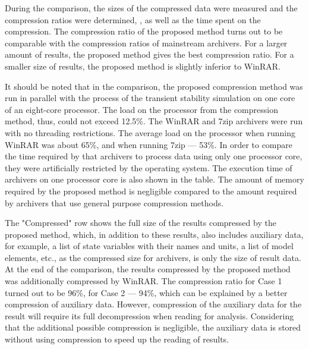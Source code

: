 \documentclass[lettersize,journal]{IEEEtran}
\begin{document}
During the comparison, the sizes of the compressed data were measured and the compression ratios were determined, 
, as well as the time spent on the compression. 
The compression ratio of the proposed method turns out to be comparable with the compression ratios of mainstream 
archivers. For a larger amount of results, the proposed method gives the best compression ratio. 
For a smaller size of results, the proposed method is slightly inferior to WinRAR.

It should be noted that in the comparison, the proposed compression method was run in parallel with the process 
of  the transient stability simulation on one core of an eight-core processor. 
The load on the processor from the compression method, thus, could not exceed 12.5\%. 
The WinRAR and 7zip archivers were run with no threading restrictions. 
The average load on the processor when running WinRAR was about 65\%, and when running 7zip --- 53\%. 
In order to compare the time required by that archivers to process data using only one processor core, they 
were artificially restricted by the operating system. The execution time of archivers on one 
processor core is also shown in the table. The amount of memory required by the proposed method is negligible 
compared to the amount required by archivers that use general purpose compression methods.

The "Compressed" row shows the full size of the results compressed by the proposed method, which, 
in addition to these results, also includes auxiliary data, for example, a list of state 
variables with their names and units, a list of model elements, etc., as the compressed size for archivers, 
is only the size of result data. At the end of the comparison, the results compressed 
by the proposed method was additionally compressed by WinRAR. The compression ratio for Case 1 turned out 
to be 96\%, for Case 2 --- 94\%, which can be explained by a better compression of auxiliary data. 
However, compression of the auxiliary data for the result will require 
its full decompression when reading for analysis. Considering that the additional possible compression is negligible, the auxiliary data is stored without using compression to speed up the reading of results.
\end{document}
